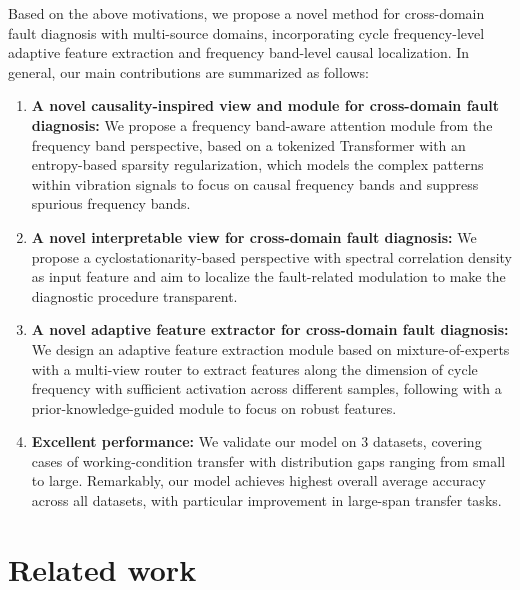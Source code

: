 \documentclass{article}
\begin{document}
	Based on the above motivations, we propose a novel method for cross-domain fault diagnosis with multi-source domains, incorporating cycle frequency-level adaptive feature extraction and frequency band-level causal localization. In general, our main contributions are summarized as follows:
	\begin{enumerate}
		\item \textbf{A novel causality-inspired view and module for cross-domain fault diagnosis:} We propose a frequency band-aware attention module from the frequency band perspective, based on a tokenized Transformer with an entropy-based sparsity regularization, which models the complex patterns within vibration signals to focus on causal frequency bands and suppress spurious frequency bands. 
		\item \textbf{A novel interpretable view for cross-domain fault diagnosis:} We propose a cyclostationarity-based perspective with spectral correlation density as input feature and aim to localize the fault-related modulation to make the diagnostic procedure transparent.
		\item \textbf{A novel adaptive feature extractor for cross-domain fault diagnosis:} We design an adaptive feature extraction module based on mixture-of-experts with a multi-view router to extract features along the dimension of cycle frequency with sufficient activation across different samples, following with a prior-knowledge-guided module to focus on robust features.
		\item \textbf{Excellent performance:} We validate our model on 3 datasets, covering cases of working-condition transfer with distribution gaps ranging from small to large. Remarkably, our model achieves highest overall average accuracy across all datasets, with particular improvement in large-span transfer tasks.
	\end{enumerate}
	
	\section{Related work}
\end{document}
